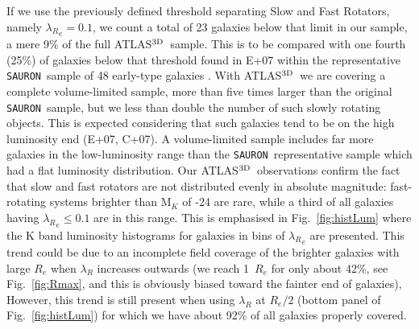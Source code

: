 \documentclass[useAMS,usenatbib,usegraphicx]{mn2e}
\newcommand{\Sauron}{\texttt{SAURON}}
\newcommand{\atlas}{{ATLAS$^{\rm 3D}$}}
\begin{document}
If we use the previously defined threshold separating Slow and Fast Rotators,
namely ${\lambda_R}_e = 0.1$, we count a total of 23 galaxies below that limit in our sample,
a mere 9\% of the full \atlas\ sample. This is to be compared with one fourth 
(25\%) of galaxies below that threshold found in E+07 
within the representative \Sauron\ sample of 48 early-type galaxies
\citep{deZeeuw+02}. With \atlas\ we
are covering a complete volume-limited sample, more than five times larger than the original
\Sauron\ sample, but we less than double the number of such slowly rotating
objects. This is expected considering that such galaxies tend to be on the high luminosity
end (E+07, C+07). A volume-limited sample includes far more galaxies in the low-luminosity range
than the \Sauron\ representative sample which had a flat luminosity
distribution. Our \atlas\ observations confirm the fact that slow and
fast rotators are not distributed evenly in absolute magnitude: fast-rotating systems brighter 
than M$_K$ of -24 are rare, while a third of all galaxies having ${\lambda_R}_e \leq 0.1$ are in this range.
This is emphasised in Fig.~\ref{fig:histLum} where
the K band luminosity histograms for galaxies in bins of ${\lambda_R}_e$ are presented. 
This trend could be due to an incomplete field coverage of the brighter galaxies with large $R_e$ 
when $\lambda_R$ increases outwards (we reach 1~$R_e$ for only 
about 42\%, see Fig.~\ref{fig:Rmax}, and this is obviously biased toward the fainter end of galaxies), 
However, this trend is still present when using $\lambda_R$ at $R_e / 2$ 
(bottom panel of Fig.~\ref{fig:histLum}) 
for which we have about 92\% of all galaxies properly covered. 
\end{document}

